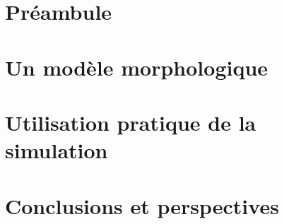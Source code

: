 \documentclass[ twoside,openright,titlepage,numbers=noenddot,headinclude,%
                footinclude=true,cleardoublepage=empty,abstractoff, %
                BCOR=5mm,paper=a4,fontsize=11pt,%
                francais ,ngerman,american%
                ]{scrreprt}
\begin{document}
\frenchspacing
\raggedbottom
{} %
\renewcommand*{\bibname}{Bibliographie}
\pagestyle{plain}




\cleardoublepage
\cleardoublepage
\cleardoublepage
\cleardoublepage
\pagestyle{scrheadings}
\cleardoublepage

\cleardoublepage{}

\cleardoublepage
{}
\part{Préambule \label{part:preamb}}


\cleardoublepage
{}
\part{Un modèle morphologique \label{part:model}}



\cleardoublepage
{}
\part{Utilisation pratique de la simulation \label{part:simu}}



\cleardoublepage
{}
\part{Conclusions et perspectives \label{part:conc}}


% 
% 
% 
% 
\end{document}
